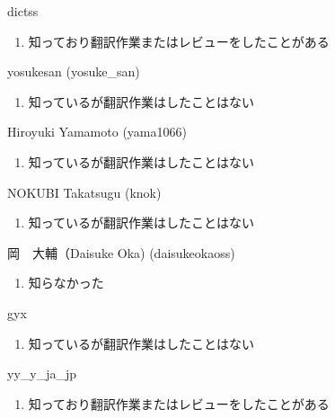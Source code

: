 \begin{prework}{ dictss }
  \begin{enumerate}
  \item 知っており翻訳作業またはレビューをしたことがある
  \end{enumerate}
\end{prework}

\begin{prework}{ yosukesan (yosuke\_san) }
  \begin{enumerate}
  \item 知っているが翻訳作業はしたことはない
  \end{enumerate}
\end{prework}

\begin{prework}{ Hiroyuki Yamamoto (yama1066) }
  \begin{enumerate}
  \item 知っているが翻訳作業はしたことはない
  \end{enumerate}
\end{prework}

\begin{prework}{ NOKUBI Takatsugu (knok) }
  \begin{enumerate}
  \item 知っているが翻訳作業はしたことはない
  \end{enumerate}
\end{prework}

\begin{prework}{ 岡　大輔（Daisuke Oka) (daisukeokaoss) }
  \begin{enumerate}
  \item 知らなかった
  \end{enumerate}
\end{prework}

\begin{prework}{ gyx }
  \begin{enumerate}
  \item 知っているが翻訳作業はしたことはない
  \end{enumerate}
\end{prework}

\begin{prework}{ yy\_y\_ja\_jp }
  \begin{enumerate}
  \item 知っており翻訳作業またはレビューをしたことがある
  \end{enumerate}
\end{prework}
